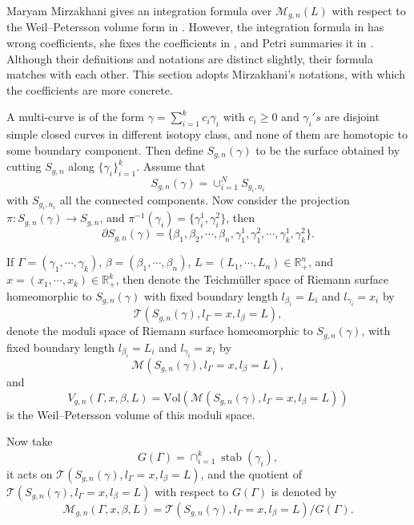  
 Maryam Mirzakhani gives an integration formula over  $\mathscr{M}_{g,n}(L)$ with respect to the  Weil--Petersson volume form  in \cite{Mirzakhani:2006fta}. However, the integration formula in  \cite{Mirzakhani:2006fta} has wrong coefficients, she fixes the coefficients in \cite{growthofsimple}, and Petri summaries it in \cite{Teithe}. Although their definitions and notations are distinct slightly, their formula matches with each other. This section adopts Mirzakhani's notations, with which the coefficients are more concrete.

A multi-curve is of the form $\gamma=\sum_{i=1}^kc_i\gamma_i$ with $c_i\geq 0$ and $\gamma_i's$ are disjoint simple closed curves in different isotopy class, and none of them are homotopic to some boundary component. Then define $S_{g,n}(\gamma)$
to be the surface obtained by cutting $S_{g,n}$ along $\{\gamma_i\}_{i=1}^k$. Assume that $$
S_{g,n}(\gamma)=\cup_{i=1}^NS_{g_i,n_i}
$$
with $S_{g_i,n_i}$ all the connected components. Now consider the projection  $\pi\colon S_{g,n}(\gamma)\to S_{g,n}$, and  $\pi^{-1}(\gamma_i)=\{\gamma_i^1,\gamma_i^2\}$, then  $$
\partial S_{g,n}(\gamma)=\{\beta_1,\beta_2,\cdots,\beta_n,\gamma_1^1,\gamma_1^2,\cdots,\gamma_k^1,\gamma_k^2\}.
$$

If $\Gamma=(\gamma_1,\cdots,\gamma_k)$,  $\beta=(\beta_1,\cdots,\beta_n)$, $L=(L_1,\cdots,L_n)\in \mathbb{R}_+^n$, and $x=(x_1,\cdots,x_k)\in \mathbb{R}_+^k$, then denote the Teichm\"uller space of Riemann surface homeomorphic to $S_{g,n}(\gamma)$ with fixed boundary length $l_{\beta_i}=L_i$ and $l_{\gamma_i}=x_i$ by $$
\mathscr{T}(S_{g,n}(\gamma),l_\Gamma=x,l_\beta=L),
$$
denote the moduli space of Riemann surface homeomorphic to $S_{g,n}(\gamma)$, with fixed boundary length $l_{\beta_i}=L_i$ and $l_{\gamma_i}=x_i$ by $$
\mathscr{M}(S_{g,n}(\gamma),l_\Gamma=x,l_\beta=L),
$$
and  $$
 V_{g,n}(\Gamma,x,\beta,L)=\mathrm{Vol}(\mathscr{M}(S_{g,n}(\gamma),l_\Gamma=x,l_\beta=L))
 $$
 is the Weil--Petersson volume of this moduli space.
 
 Now take $$G(\Gamma)=\cap_{i=1}^k\operatorname{stab}(\gamma_i),$$
 it acts on $\mathscr{T}(S_{g,n}(\gamma),l_\Gamma=x,l_\beta=L)$, 
 and the quotient of $\mathscr{T}(S_{g,n}(\gamma),l_\Gamma=x,l_\beta=L)$ with respect to $G(\Gamma)$ is denoted by  $$
\mathscr{M}_{g,n}(\Gamma,x,\beta,L)= \mathscr{T}(S_{g,n}(\gamma),l_\Gamma=x,l_\beta=L)/G(\Gamma).
 $$
 
